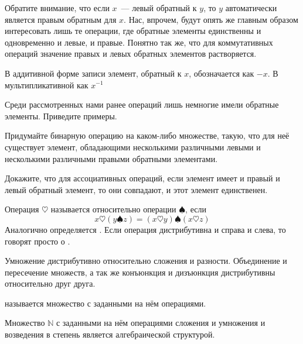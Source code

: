 Обратите внимание, что если $x$~— левый обратный к $y$, то $y$ автоматически является правым обратным для $x$. Нас, впрочем, будут опять же главным образом интересовать лишь те операции, где обратные элементы единственны и одновременно и левые, и правые. Понятно так же, что для коммутативных операций значение правых и левых обратных элементов растворяется.

В аддитивной форме записи элемент, обратный к $x$, обозначается как $-x$. В мультипликативной как $x^{-1}$

\begin{exercise}
Среди рассмотренных нами ранее операций лишь немногие имели обратные элементы. Приведите примеры.
\end{exercise}

\begin{exercise}
Придумайте бинарную операцию на каком-либо множестве, такую, что для неё существует элемент, обладающими несколькими различными левыми и несколькими различными правыми обратными элементами.
\end{exercise}

\begin{exercise}
Докажите, что для ассоциативных операций, если элемент имеет и правый и левый обратный элемент, то они совпадают, и этот элемент единственен.
\end{exercise}

\begin{definition}
Операция $\heartsuit$ называется  относительно операции $\spadesuit$, если
$$x\heartsuit (y\spadesuit z) = (x\heartsuit y) \spadesuit (x \heartsuit z)$$
Аналогично определяется . Если операция дистрибутивна и справа и слева, то говорят просто о .
\end{definition}

\begin{example}
Умножение дистрибутивно относительно сложения и разности. Объединение и пересечение множеств, а так же конъюнкция и дизъюнкция дистрибутивны относительно друг друга.
\end{example}

\begin{definition}
	 называется множество с заданными на нём операциями.
\end{definition}

\begin{example}
	Множество $\mathbb{N}$ с заданными на нём операциями сложения и умножения и возведения в степень является алгебраической структурой.
\end{example}

